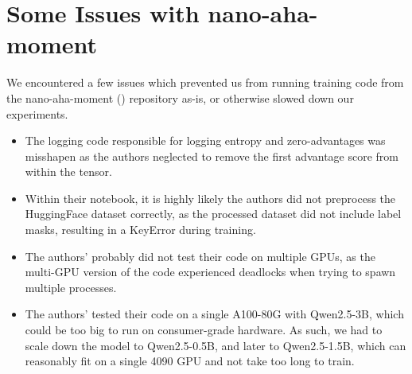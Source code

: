 \documentclass{article} %
\theoremstyle{definition}
\begin{document}
\section{Some Issues with nano-aha-moment}
\label{sec:nano-aha-moment-issues}
We encountered a few issues which prevented us from running training code from
the nano-aha-moment (\cite{nano-aha-moment}) repository as-is, or otherwise
slowed down our experiments.
\begin{itemize}
    \item The logging code responsible for logging entropy and zero-advantages
        was misshapen as the authors neglected to remove the first advantage score
        from within the tensor.
    \item Within their notebook, it is highly likely the authors did not preprocess
        the HuggingFace dataset correctly, as the processed dataset did not include
        label masks, resulting in a KeyError during training.
    \item The authors' probably did not test their code on multiple GPUs,
        as the multi-GPU version of the code experienced deadlocks when
        trying to spawn multiple processes.
    \item The authors' tested their code on a single A100-80G with Qwen2.5-3B,
        which could be too big to run on consumer-grade hardware.
        As such, we had to scale down the model to Qwen2.5-0.5B, and later to Qwen2.5-1.5B,
        which can reasonably fit on a single 4090 GPU and not take too long to train.
\end{itemize}
\end{document}
